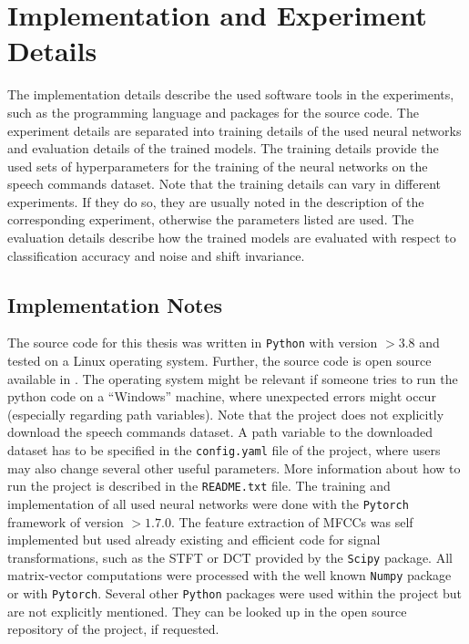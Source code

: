 
\section{Implementation and Experiment Details}\label{sec:exp_details}
The implementation details describe the used software tools in the experiments, such as the programming language and packages for the source code.
The experiment details are separated into training details of the used neural networks and evaluation details of the trained models.
The training details provide the used sets of hyperparameters for the training of the neural networks on the speech commands dataset.
Note that the training details can vary in different experiments.
If they do so, they are usually noted in the description of the corresponding experiment, otherwise the parameters listed are used.
The evaluation details describe how the trained models are evaluated with respect to classification accuracy and noise and shift invariance.



\subsection{Implementation Notes}\label{sec:exp_details_implementation}
The source code for this thesis was written in \texttt{Python} with version $>3.8$ and tested on a Linux operating system.
Further, the source code is open source available in \cite{KWSGame}.
The operating system might be relevant if someone tries to run the python code on a \enquote{Windows} machine, where unexpected errors might occur (especially regarding path variables).
Note that the project does not explicitly download the speech commands dataset.
A path variable to the downloaded dataset has to be specified in the \texttt{config.yaml} file of the project, where users may also change several other useful parameters.
More information about how to run the project is described in the \texttt{README.txt} file.
The training and implementation of all used neural networks were done with the \texttt{Pytorch} \cite{Pytorch} framework of version $>1.7.0$. 
The feature extraction of MFCCs was self implemented but used already existing and efficient code for signal transformations, such as the STFT or DCT provided by the \texttt{Scipy} package.
All matrix-vector computations were processed with the well known \texttt{Numpy} package or with \texttt{Pytorch}.
Several other \texttt{Python} packages were used within the project but are not explicitly mentioned.
They can be looked up in the open source repository of the project, if requested.



